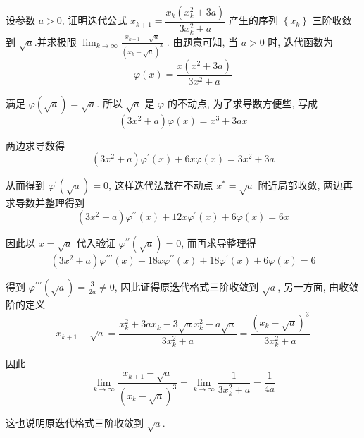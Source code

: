 \begin{tcolorbox}[enhanced,colback=10,colframe=9,breakable,coltitle=green!25!black,title=2024]


  
设参数 $ a>0 $, 证明迭代公式 $ x_{k+1}=\dfrac{x_{k}\left(x_{k}^{2}+3 a\right)}{3 x_{k}^{2}+a} $ 产生的序列 $ \left\{x_{k}\right\} $ 三阶收敛到 $ \sqrt{a} $.并求极限 $\displaystyle \lim _{k \rightarrow \infty} \frac{x_{k+1}-\sqrt{a}}{\left(x_{k}-\sqrt{a}\right)^{3}} $ .
\tcblower
 由题意可知, 当 $ a>0 $ 时, 迭代函数为
$$
\varphi(x)=\frac{x\left(x^{2}+3 a\right)}{3 x^{2}+a}
$$

满足 $ \varphi(\sqrt{a})=\sqrt{a} $. 所以 $ \sqrt{a} $ 是 $ \varphi $ 的不动点, 为了求导数方便些, 写成
$$
\left(3 x^{2}+a\right) \varphi(x)=x^{3}+3 a x
$$

两边求导数得
$$
\left(3 x^{2}+a\right) \varphi^{\prime}(x)+6 x \varphi(x)=3 x^{2}+3 a
$$

从而得到 $ \varphi^{\prime}(\sqrt{a})=0 $, 这样迭代法就在不动点 $ x^{*}=\sqrt{a} $ 附近局部收敛, 两边再求导数并整理得到
$$
\left(3 x^{2}+a\right) \varphi^{\prime \prime}(x)+12 x \varphi^{\prime}(x)+6 \varphi(x)=6 x
$$

因此以 $ x=\sqrt{a} $ 代入验证 $ \varphi^{\prime \prime}(\sqrt{a})=0 $, 而再求导整理得
$$
\left(3 x^{2}+a\right) \varphi^{\prime \prime \prime}(x)+18 x \varphi^{\prime \prime}(x)+18 \varphi^{\prime}(x)+6 \varphi(x)=6
$$

得到 $ \varphi^{\prime \prime \prime}(\sqrt{a})=\frac{3}{2a} \neq 0 $, 因此证得原迭代格式三阶收敛到 $ \sqrt{a} $, 另一方面, 由收敛阶的定义
$$
x_{k+1}-\sqrt{a}=\frac{x_{k}^{2}+3 a x_{k}-3 \sqrt{a} x_{k}^{2}-a \sqrt{a}}{3 x_{k}^{2}+a}=\frac{\left(x_{k}-\sqrt{a}\right)^{3}}{3 x_{k}^{2}+a}
$$

因此
$$
\lim _{k \rightarrow \infty} \frac{x_{k+1}-\sqrt{a}}{\left(x_{k}-\sqrt{a}\right)^{3}}=\lim _{k \rightarrow \infty} \frac{1}{3 x_{k}^{2}+a}=\frac{1}{4 a}
$$

这也说明原迭代格式三阶收敛到 $ \sqrt{a} $.
\end{tcolorbox}


